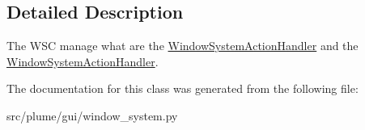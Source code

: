 \subsection{Detailed Description}
The W\+SC manage what are the \hyperlink{classplume-creator_1_1src_1_1plume_1_1gui_1_1window__system_1_1_window_system_action_handler}{Window\+System\+Action\+Handler} and the \hyperlink{classplume-creator_1_1src_1_1plume_1_1gui_1_1window__system_1_1_window_system_action_handler}{Window\+System\+Action\+Handler}. 

The documentation for this class was generated from the following file\+:\begin{DoxyCompactItemize}
\item 
src/plume/gui/window\+\_\+system.\+py\end{DoxyCompactItemize}
